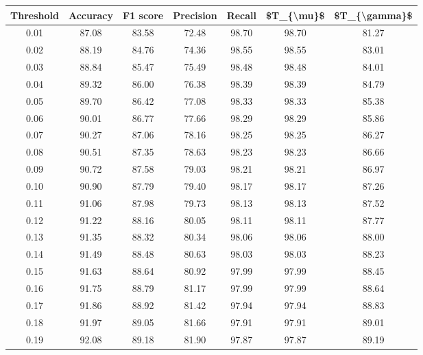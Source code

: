 \begin{tabular}{|c|c|c|c|c|c|c|}
\hline
 Threshold &  Accuracy &  F1 score &  Precision &  Recall &  \$T\_\{\textbackslash mu\}\$ &  \$T\_\{\textbackslash gamma\}\$ \\
\hline
      0.01 &     87.08 &     83.58 &      72.48 &   98.70 &      98.70 &         81.27 \\
      0.02 &     88.19 &     84.76 &      74.36 &   98.55 &      98.55 &         83.01 \\
      0.03 &     88.84 &     85.47 &      75.49 &   98.48 &      98.48 &         84.01 \\
      0.04 &     89.32 &     86.00 &      76.38 &   98.39 &      98.39 &         84.79 \\
      0.05 &     89.70 &     86.42 &      77.08 &   98.33 &      98.33 &         85.38 \\
      0.06 &     90.01 &     86.77 &      77.66 &   98.29 &      98.29 &         85.86 \\
      0.07 &     90.27 &     87.06 &      78.16 &   98.25 &      98.25 &         86.27 \\
      0.08 &     90.51 &     87.35 &      78.63 &   98.23 &      98.23 &         86.66 \\
      0.09 &     90.72 &     87.58 &      79.03 &   98.21 &      98.21 &         86.97 \\
      0.10 &     90.90 &     87.79 &      79.40 &   98.17 &      98.17 &         87.26 \\
      0.11 &     91.06 &     87.98 &      79.73 &   98.13 &      98.13 &         87.52 \\
      0.12 &     91.22 &     88.16 &      80.05 &   98.11 &      98.11 &         87.77 \\
      0.13 &     91.35 &     88.32 &      80.34 &   98.06 &      98.06 &         88.00 \\
      0.14 &     91.49 &     88.48 &      80.63 &   98.03 &      98.03 &         88.23 \\
      0.15 &     91.63 &     88.64 &      80.92 &   97.99 &      97.99 &         88.45 \\
      0.16 &     91.75 &     88.79 &      81.17 &   97.99 &      97.99 &         88.64 \\
      0.17 &     91.86 &     88.92 &      81.42 &   97.94 &      97.94 &         88.83 \\
      0.18 &     91.97 &     89.05 &      81.66 &   97.91 &      97.91 &         89.01 \\
      0.19 &     92.08 &     89.18 &      81.90 &   97.87 &      97.87 &         89.19 \\

\end{tabular}
